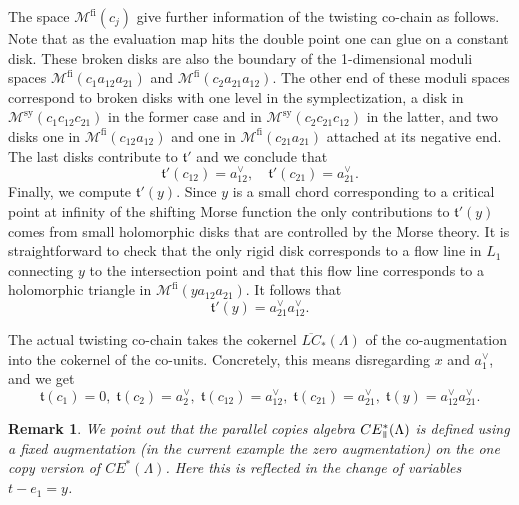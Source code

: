 \documentclass{gtpart}
\newtheorem{rem}[thm]{Remark}
\renewcommand{\t}{\mathfrak{t}}
\newcommand{\fl}{\mathrm{fi}}
\newcommand{\sy}{\mathrm{sy}}
\renewcommand{\parallel}{{\mkern3mu\vphantom{\perp}\vrule depth 0pt\mkern2mu\vrule depth
0pt\mkern3mu}}
\begin{document}
The space $\mathcal{M}^{\fl}(c_{j})$ give further information of the twisting co-chain as follows. Note that as the evaluation map hits the double point one can glue on a constant disk. These broken disks are also the boundary of the 1-dimensional moduli spaces $\mathcal{M}^{\fl}(c_{1}a_{12}a_{21})$ and $\mathcal{M}^{\fl}(c_{2}a_{21}a_{12})$. The other end of these moduli spaces correspond to broken disks with one level in the symplectization, a disk in $\mathcal{M}^{\sy}(c_{1}c_{12}c_{21})$ in the former case and in $\mathcal{M}^{\sy}(c_{2}c_{21}c_{12})$ in the latter, and two disks one in $\mathcal{M}^{\fl}(c_{12}a_{12})$ and one in $\mathcal{M}^{\fl}(c_{21}a_{21})$ attached at its negative end. The last disks contribute to $\t'$ and we conclude that
\[ 
\t'(c_{12})=a_{12}^{\vee},\quad \t'(c_{21})=a_{21}^{\vee}.
\]
Finally, we compute $\t'(y)$. Since $y$ is a small chord corresponding to a critical point at infinity of the shifting Morse function the only contributions to $\t'(y)$ comes from small holomorphic disks that are controlled by the Morse theory. It is straightforward to check that the only rigid disk corresponds to a flow line in $L_{1}$ connecting $y$ to the intersection point and that this flow line corresponds to a holomorphic triangle in $\mathcal{M}^{\fl}(ya_{12}a_{21})$. It follows that
\[ 
\t'(y)=a_{21}^{\vee}a_{12}^{\vee}.
\] 

The actual twisting co-chain takes the cokernel $\overline{LC}_{\ast}(\Lambda)$ of the co-augmentation into the cokernel of the co-units. Concretely, this means disregarding $x$ and $a_{1}^{\vee}$, and we get
\[ 
\t(c_{1})=0,\;\t(c_{2})=a_{2}^{\vee},\;\t(c_{12})=a_{12}^{\vee},\;\t(c_{21})=a_{21}^{\vee},
\;\t(y)=a_{12}^{\vee}a_{21}^{\vee}.
\]


\begin{rem}
	We point out that the parallel copies algebra $CE_{\parallel}^{\ast}(\Lambda)$ is defined using a fixed augmentation (in the current example the zero augmentation) on the one copy version of $CE^{\ast}(\Lambda)$. Here this is reflected in the change of variables $t-e_{1}=y$.
\end{rem}
\end{document}
